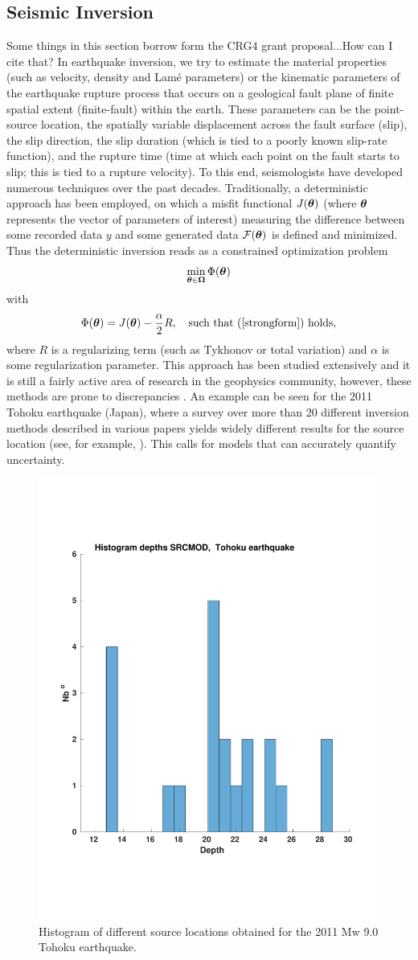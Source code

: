  \subsection{Seismic  Inversion}
\color{blue} Some things in this section borrow form the CRG4 grant proposal...How can I cite that? \color{black}
In earthquake  inversion, we try to estimate the material properties (such as velocity, density and Lam\'e parameters) or the kinematic parameters of the earthquake rupture process that occurs on a geological fault plane of finite spatial extent (finite-fault) within the earth. These parameters can be the point-source location, the  spatially variable displacement across the fault surface (slip), the slip direction, the slip duration (which is tied to a poorly known slip-rate function), and the rupture time (time at which each point on the fault starts to slip; this is tied to a rupture velocity). To this end, seismologists have developed numerous techniques over the past decades.  Traditionally, a deterministic approach has been employed, on which a misfit  functional $J(\bm{\theta})$ (where $\bm{\theta}$ represents the vector of parameters of interest) measuring the difference between some recorded data $y$ and some generated data $\mathcal{F}(\bm{\theta})$ is defined and minimized. Thus the deterministic inversion reads as a constrained optimization problem $$\min_{\bm{\theta} \in \bm{\Omega}} \Phi(\bm{\theta})$$ with $$\Phi(\bm{\theta})=J(\bm{\theta})-\frac{\alpha}{2}R,\quad \text{such that (\ref{strongform}) holds}, $$  where $R$ is a regularizing term (such as Tykhonov or total variation) and $\alpha$ is  some regularization parameter. This approach has been studied extensively \cite{hormander1985analysis,komatitsch1999introduction} and it is still a fairly active area of research in the geophysics community, however, these methods are prone to discrepancies \cite{beresnev2003uncertainties}. An example can be seen for the 2011 Tohoku earthquake (Japan), where a survey over more than 20 different inversion methods described in various papers  yields widely different results for the source location (see, for example, \cite{hayes2011rapid,shao2011focal,SRCMOD}). This calls for models that can  accurately quantify  uncertainty.\begin{figure}[H]
	\centering
	\includegraphics[width=0.5\linewidth]{figures/HistogramTohoku}
	\caption{Histogram of different source locations obtained for the 2011 Mw 9.0 Tohoku earthquake.}
	\label{fig:histogramtohoku}
\end{figure}
